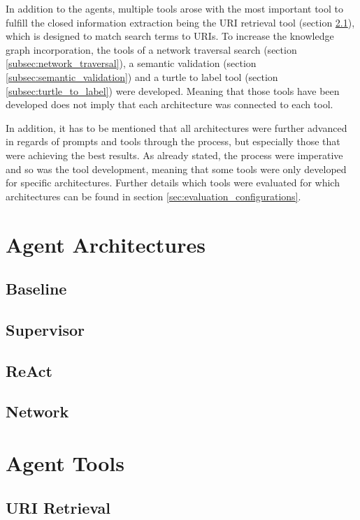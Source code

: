 \documentclass[a4paper,oneside,bibliography=totoc]{scrbook}
\begin{document}
In addition to the agents, multiple tools arose with the most important tool to fulfill the closed information extraction being the URI retrieval tool (section \ref{subsec:uri_retrieval}), which is designed to match search terms to URIs. To increase the knowledge graph incorporation, the tools of a network traversal search (section \ref{subsec:network_traversal}), a semantic validation (section \ref{subsec:semantic_validation}) and a turtle to label tool (section \ref{subsec:turtle_to_label}) were developed. Meaning that those tools have been developed does not imply that each architecture was connected to each tool.

In addition, it has to be mentioned that all architectures were further advanced in regards of prompts and tools through the process, but especially those that were achieving the best results. As already stated, the process were imperative and so was the tool development, meaning that some tools were only developed for specific architectures. Further details which tools were evaluated for which architectures can be found in section \ref{sec:evaluation_configurations}.

\section{Agent Architectures}
\label{sec:agent_architectures}
\subsection{Baseline}
\label{subsec:baseline}
\subsection{Supervisor}
\label{subsec:supervisor}
\subsection{ReAct}
\label{subsec:react}
\subsection{Network}
\label{subsec:network}

\section{Agent Tools}
\label{sec:agent_tools}
\subsection{URI Retrieval}
\label{subsec:uri_retrieval}
\end{document}
